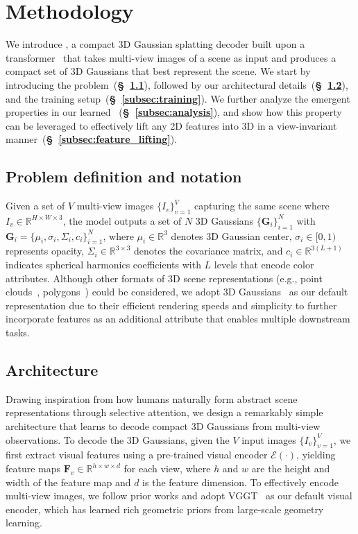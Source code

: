 

\section{Methodology}
\label{sec:method}
We introduce \ours, a compact 3D Gaussian splatting decoder built upon a transformer~\cite{vaswani2017attention} that takes multi-view images of a scene as input and produces a compact set of 3D Gaussians that best represent the scene. We start by introducing the problem~(\textbf{\S~\ref{subsec:problem_def}}), followed by our architectural details~(\textbf{\S~\ref{subsec:architecture}}), and the training setup~(\textbf{\S~\ref{subsec:training}}). We further analyze the emergent properties in our learned \mbox{\ours~(\textbf{\S~\ref{subsec:analysis}})}, and show how this property can be leveraged to effectively lift any 2D features into 3D in a view-invariant manner~(\textbf{\S~\ref{subsec:feature_lifting}}).


\subsection{Problem definition and notation}
\label{subsec:problem_def}
Given a set of $V$ multi-view images $\{I_v\}_{v=1}^V$ capturing the same scene where $I_v\in\mathbb{R}^{H \times W \times 3}$, the model outputs a set of $N$ 3D Gaussians $\{\mathbf{G}_i\}_{i=1}^N$ with $\mathbf{G}_i=\{\mu_i,\sigma_i,\Sigma_i,c_i\}_{i=1}^N$, where $\mu_i \in\mathbb{R}^3$ denotes 3D Gaussian center, $\sigma_i \in [0,1)$ represents opacity, $\Sigma_i \in \mathbb{R}^{3 \times 3}$ denotes the covariance matrix, and $c_i \in \mathbb{R}^{3(L+1)}$ indicates spherical harmonics coefficients with $L$ levels that encode color attributes. Although other formats of 3D scene representations (e.g., point clouds~\cite{wang2025vggt,wang2024dust3r}, polygons~\cite{nan2017polyfit}) could be considered, we adopt 3D Gaussians~\cite{kerbl20233d} as our default representation due to their efficient rendering speeds and simplicity to further incorporate features as an additional attribute that enables multiple downstream tasks. 

\subsection{Architecture}
\label{subsec:architecture}
Drawing inspiration from how humans naturally form abstract scene representations through selective attention, we design a remarkably simple architecture that learns to decode compact 3D Gaussians from multi-view observations. 
To decode the 3D Gaussians, given the $V$ input images $\{I_v\}_{v=1}^V$, we first extract visual features using a pre-trained visual encoder $\mathcal{E}(\cdot)$, yielding feature maps $\mathbf{F}_v \in \mathbb{R}^{h \times w \times d}$ for each view, where $h$ and $w$ are the height and width of the feature map and $d$ is the feature dimension. To effectively encode multi-view images, we follow prior works and adopt VGGT~\cite{wang2025vggt} as our default visual encoder, which has learned rich geometric priors from large-scale geometry learning.

